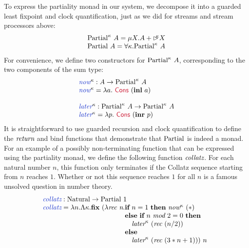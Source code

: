 To express the partiality monad in our system, we decompose it into a
guarded least fixpoint and clock quantification, just as we did for
streams and stream processors above:
\begin{displaymath}
  \begin{array}{l}
    \textrm{Partial}^\kappa~A = \mu X. A + \mathord{\rhd\kern-0.4em^{\kappa}} X \\
    \textrm{Partial}~A = \forall \kappa. \textrm{Partial}^\kappa~A
  \end{array}
\end{displaymath}
For convenience, we define two constructors for
$\textrm{Partial}^\kappa~A$, corresponding to the two components of
the sum type:
\begin{displaymath}
  \begin{array}{l}
    \defn{now}^\kappa : A \to \tyname{Partial}^\kappa~A \\
    \defn{now}^\kappa = \lambda a.~\cons{Cons}~(\kw{inl}~a) \\
    \\
    \defn{later}^\kappa : \tyname{Partial}^\kappa~A \to \tyname{Partial}^\kappa~A \\
    \defn{later}^\kappa = \lambda p.~\cons{Cons}~(\kw{inr}~p)
  \end{array}
\end{displaymath}
It is straightforward to use guarded recursion and clock
quantification to define the $\textit{return}$ and bind functions that
demonstrate that $\textrm{Partial}$ is indeed a monad. For an example
of a possibly non-terminating function that can be expressed using the
partiality monad, we define the following function
$\textit{collatz}$. For each natural number $n$, this function only
terminates if the Collatz sequence starting from $n$ reaches
$1$. Whether or not this sequence reaches $1$ for all $n$ is a famous
unsolved question in number theory.
\begin{displaymath}
  \begin{array}{l}
    \defn{collatz} : \tyname{Natural} \to \tyname{Partial}~1 \\
    \defn{collatz} = \lambda n. \Lambda \kappa. \kw{fix}~(\lambda \ident{rec}~\ident{n}.
    \begin{array}[t]{@{}l}
      \kw{if}~n = 1~\kw{then}~\ident{now}^\kappa~(*) \\
      \kw{else}~\kw{if}~n~\ident{mod}~2 = 0~\kw{then} \\
      \quad \ident{later}^\kappa~(\ident{rec}~(n/2)) \\
      \kw{else} \\
      \quad \ident{later}^\kappa~(\ident{rec}~(3*n + 1)))~n
    \end{array}
  \end{array}
\end{displaymath}

